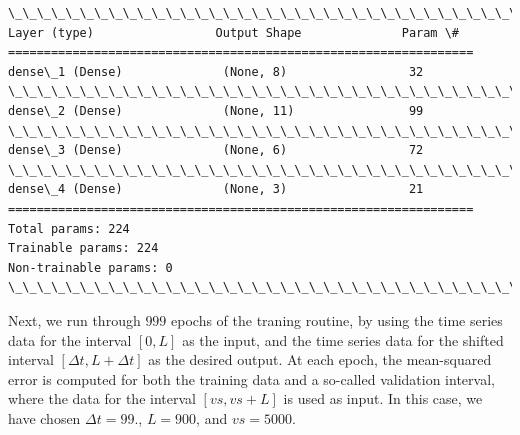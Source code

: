 \documentclass[11pt]{article}
\begin{document}
    \begin{Verbatim}[commandchars=\\\{\}]
\_\_\_\_\_\_\_\_\_\_\_\_\_\_\_\_\_\_\_\_\_\_\_\_\_\_\_\_\_\_\_\_\_\_\_\_\_\_\_\_\_\_\_\_\_\_\_\_\_\_\_\_\_\_\_\_\_\_\_\_\_\_\_\_\_
Layer (type)                 Output Shape              Param \#   
=================================================================
dense\_1 (Dense)              (None, 8)                 32        
\_\_\_\_\_\_\_\_\_\_\_\_\_\_\_\_\_\_\_\_\_\_\_\_\_\_\_\_\_\_\_\_\_\_\_\_\_\_\_\_\_\_\_\_\_\_\_\_\_\_\_\_\_\_\_\_\_\_\_\_\_\_\_\_\_
dense\_2 (Dense)              (None, 11)                99        
\_\_\_\_\_\_\_\_\_\_\_\_\_\_\_\_\_\_\_\_\_\_\_\_\_\_\_\_\_\_\_\_\_\_\_\_\_\_\_\_\_\_\_\_\_\_\_\_\_\_\_\_\_\_\_\_\_\_\_\_\_\_\_\_\_
dense\_3 (Dense)              (None, 6)                 72        
\_\_\_\_\_\_\_\_\_\_\_\_\_\_\_\_\_\_\_\_\_\_\_\_\_\_\_\_\_\_\_\_\_\_\_\_\_\_\_\_\_\_\_\_\_\_\_\_\_\_\_\_\_\_\_\_\_\_\_\_\_\_\_\_\_
dense\_4 (Dense)              (None, 3)                 21        
=================================================================
Total params: 224
Trainable params: 224
Non-trainable params: 0
\_\_\_\_\_\_\_\_\_\_\_\_\_\_\_\_\_\_\_\_\_\_\_\_\_\_\_\_\_\_\_\_\_\_\_\_\_\_\_\_\_\_\_\_\_\_\_\_\_\_\_\_\_\_\_\_\_\_\_\_\_\_\_\_\_

    \end{Verbatim}

    Next, we run through \(999\) epochs of the traning routine, by using the
time series data for the interval \([0,L]\) as the input, and the time
series data for the shifted interval \([\Delta t, L+\Delta t]\) as the
desired output. At each epoch, the mean-squared error is computed for
both the training data and a so-called validation interval, where the
data for the interval \([vs,vs+L]\) is used as input. In this case, we
have chosen \(\Delta t = 99\)., \(L=900\), and \(vs=5000\).
\end{document}
